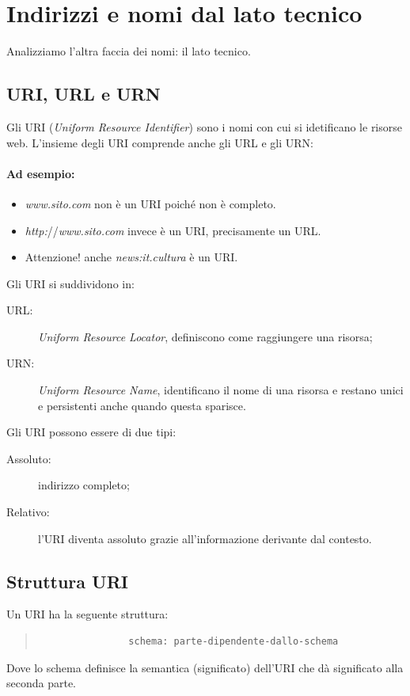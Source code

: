 	\section{Indirizzi e nomi dal lato tecnico}
		Analizziamo l'altra faccia dei nomi: il lato tecnico.
	
		\subsection{URI, URL e URN}
			Gli URI (\emph{Uniform Resource Identifier}) sono i nomi con cui si idetificano le risorse web. L'insieme degli URI comprende anche gli URL e gli URN:
			
			\paragraph*{Ad esempio:}
				\begin{itemize}[label={}]
					\item \emph{www.sito.com} non è un URI poiché non è completo.
					\item \emph{http:}//\emph{www.sito.com} invece è un URI, precisamente un URL.
					\item Attenzione! anche \emph{news:it.cultura} è un URI.
				\end{itemize}
				
				Gli URI si suddividono in:
				\begin{description}
					\item[URL:] \emph{Uniform Resource Locator}, definiscono come raggiungere una risorsa;
					\item[URN:] \emph{Uniform Resource Name}, identificano il nome di una risorsa e restano unici e persistenti anche quando questa sparisce.
				\end{description}
				
				Gli URI possono essere di due tipi:
				\begin{description}
					\item[Assoluto:] indirizzo completo;
					\item[Relativo:] l'URI diventa assoluto grazie all'informazione derivante dal contesto.
				\end{description}
		
		\subsection{Struttura URI}
			Un URI ha la seguente struttura:
			\begin{quote}
			\begin{verbatim}
				schema: parte-dipendente-dallo-schema
			\end{verbatim}
			\end{quote}
			Dove lo schema definisce la semantica (significato) dell'URI che dà significato alla seconda parte.
		
